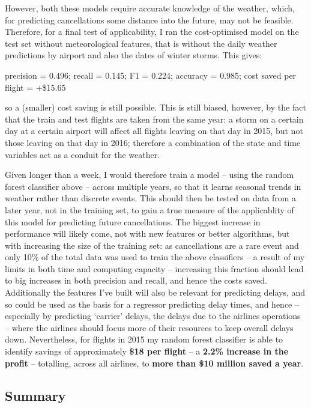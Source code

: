 \documentclass[a4paper]{article}
\begin{document}
However, both these models require accurate knowledge of the weather, which, for predicting cancellations some distance into the future, may not be feasible. Therefore, for a final test of applicability, I ran the cost-optimised model on the test set without meteorological features, that is without the daily weather predictions by airport and also the dates of winter storms. This gives:

\noindent precision = 0.496; recall = 0.145; F1 = 0.224; accuracy = 0.985; cost saved per flight = +\$15.65

\noindent so a (smaller) cost saving is still possible. This is still biased, however, by the fact that the train and test flights are taken from the same year: a storm on a certain day at a certain airport will affect all flights leaving on that day in 2015, but not those leaving on that day in 2016; therefore a combination of the state and time variables act as a conduit for the weather.

Given longer than a week, I would therefore train a model -- using the random forest classifier above -- across multiple years, so that it learns seasonal trends in weather rather than discrete events. This should then be tested on data from a later year, not in the training set, to gain a true measure of the applicablity of this model for predicting future cancellations. The biggest increase in performance will likely come, not with new features or better algorithms, but with increasing the size of the training set: as cancellations are a rare event and only 10\% of the total data was used to train the above classifiers -- a result of my limits in both time and computing capacity -- increasing this fraction should lead to big increases in both precision and recall, and hence the costs saved. Additionally the features I've built will also be relevant for predicting delays, and so could be used as the basis for a regressor predicting delay times, and hence -- especially by predicting `carrier' delays, the delays due to the airlines operations -- where the airlines should focus more of their resources to keep overall delays down. Nevertheless, for flights in 2015 my random forest classifier is able to identify savings of approximately {\bf \$18 per flight} -- a {\bf 2.2\% increase in the profit} -- totalling, across all airlines, to {\bf more than \$10 million saved a year}.

\subsection*{Summary}
\end{document}
